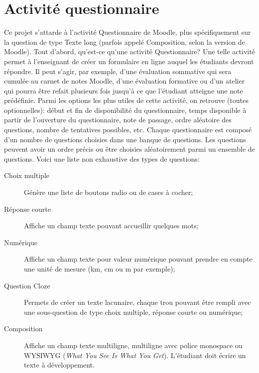 \section{Activit\'e questionnaire}
Ce projet s'attarde \`a l'activit\'e Questionnaire de Moodle, plus sp\'ecifiquement sur la question de type Texte long (parfois appel\'e Composition, selon la version de Moodle).
Tout d'abord, qu'est-ce qu'une activit\'e Questionnaire?
Une telle activit\'e permet \`a l'enseignant de cr\'eer un formulaire en ligne auquel les \'etudiants devront r\'epondre.
Il peut s'agir, par exemple, d'une \'evaluation sommative qui sera cumul\'ee au carnet de notes Moodle, d'une \'evaluation formative ou d'un atelier qui pourra \^etre refait plusieurs fois jusqu'\`a ce que l'\'etudiant atteigne une note pr\'ed\'efinie.
Parmi les options les plus utiles de cette activit\'e, on retrouve (toutes optionnelles): d\'ebut et fin de disponibilit\'e du questionnaire, temps disponible \`a partir de l'ouverture du questionnaire, note de passage, ordre al\'eatoire des questions, nombre de tentatives possibles, etc.
Chaque questionnaire est compos\'e d'un nombre de questions choisies dans une banque de questions.
Les questions peuvent avoir un ordre pr\'ecis ou \^etre choisies al\'eatoirement parmi un ensemble de questions.
Voici une liste non exhaustive des types de questions:
\begin{description}
  \item[Choix multiple]
  
  G\'en\`ere une liste de boutons radio ou de cases \`a cocher;
  
  \item[R\'eponse courte]
  
  Affiche un champ texte pouvant accueillir quelques mots;
  
  \item[Num\'erique]
  
  Affiche un champ texte pour valeur num\'erique pouvant prendre en compte une unit\'e de mesure (km, cm ou m par exemple);
  
  \item[Question Cloze]
  
  Permets de cr\'eer un texte lacunaire, chaque \og trou \fg{} pouvant \^etre rempli avec une sous-question de type choix multiple, r\'eponse courte ou num\'erique;
  
  \item[Composition]
  
  Affiche un champ texte multiligne, multiligne avec police monospace ou WYSIWYG (\textit{What You See Is What You Get}).
  L'\'etudiant doit \'ecrire un texte \`a d\'eveloppement.
\end{description}
